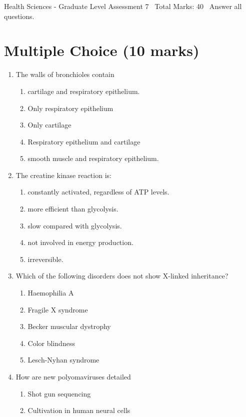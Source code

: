 \documentclass[12pt]{article}
\begin{document}
\begin{center}
Health Sciences - Graduate Level Assessment 7 \
Total Marks: 40 \
Answer all questions.
\end{center}

\section*{Multiple Choice (10 marks)}
\begin{enumerate}[label=\arabic*.]
\item The walls of bronchioles contain
\begin{enumerate}[label=(\alph*)]
    \item cartilage and respiratory epithelium.
    \item Only respiratory epithelium
    \item Only cartilage
    \item Respiratory epithelium and cartilage
    \item smooth muscle and respiratory epithelium.
\end{enumerate}
\item The creatine kinase reaction is:
\begin{enumerate}[label=(\alph*)]
    \item constantly activated, regardless of ATP levels.
    \item more efficient than glycolysis.
    \item slow compared with glycolysis.
    \item not involved in energy production.
    \item irreversible.
\end{enumerate}
\item Which of the following disorders does not show X-linked inheritance?
\begin{enumerate}[label=(\alph*)]
    \item Haemophilia A
    \item Fragile X syndrome
    \item Becker muscular dystrophy
    \item Color blindness
    \item Lesch-Nyhan syndrome
\end{enumerate}
\item How are new polyomaviruses detailed
\begin{enumerate}[label=(\alph*)]
    \item Shot gun sequencing
    \item Cultivation in human neural cells

\end{enumerate}
\end{enumerate}
\end{document}
